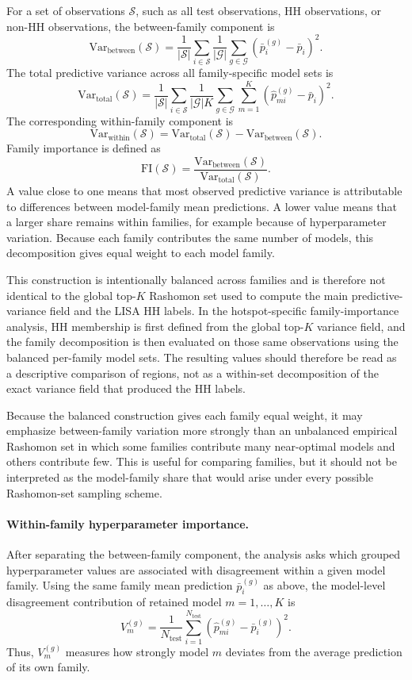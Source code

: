 For a set of observations \(\mathcal{S}\), such as all test observations, HH observations,
or non-HH observations, the between-family component is
\[
\mathrm{Var}_{\mathrm{between}}(\mathcal{S})
=
\frac{1}{|\mathcal{S}|}
\sum_{i\in \mathcal{S}}
\frac{1}{|\mathcal{G}|}
\sum_{g\in \mathcal{G}}
\left(\bar{p}^{(g)}_{i}-\bar{p}_{i}\right)^2 .
\]
The total predictive variance across all family-specific model sets is
\[
\mathrm{Var}_{\mathrm{total}}(\mathcal{S})
=
\frac{1}{|\mathcal{S}|}
\sum_{i\in \mathcal{S}}
\frac{1}{|\mathcal{G}|K}
\sum_{g\in \mathcal{G}}
\sum_{m=1}^{K}
\left(\hat{p}^{(g)}_{mi}-\bar{p}_{i}\right)^2 .
\]
The corresponding within-family component is
\[
\mathrm{Var}_{\mathrm{within}}(\mathcal{S})
=
\mathrm{Var}_{\mathrm{total}}(\mathcal{S})
-
\mathrm{Var}_{\mathrm{between}}(\mathcal{S}).
\]
Family importance is defined as
\[
\mathrm{FI}(\mathcal{S}) =
\frac{\mathrm{Var}_{\mathrm{between}}(\mathcal{S})}
{\mathrm{Var}_{\mathrm{total}}(\mathcal{S})}.
\]
A value close to one means that most observed predictive variance is attributable to
differences between model-family mean predictions. A lower value means that a larger
share remains within families, for example because of hyperparameter variation. Because
each family contributes the same number of models, this decomposition gives equal weight
to each model family.

This construction is intentionally balanced across families and is therefore not identical
to the global top-\(K\) Rashomon set used to compute the main predictive-variance field
and the LISA HH labels. In the hotspot-specific family-importance analysis, HH membership
is first defined from the global top-\(K\) variance field, and the family decomposition is then
evaluated on those same observations using the balanced per-family model sets. The
resulting values should therefore be read as a descriptive comparison of regions, not as a
within-set decomposition of the exact variance field that produced the HH labels.

Because the balanced construction gives each family equal weight, it may emphasize
between-family variation more strongly than an unbalanced empirical Rashomon set in
which some families contribute many near-optimal models and others contribute few.
This is useful for comparing families, but it should not be interpreted as the model-family
share that would arise under every possible Rashomon-set sampling scheme.

\paragraph{Within-family hyperparameter importance.}
After separating the between-family component, the analysis asks which grouped
hyperparameter values are associated with disagreement within a given model family.
Using the same family mean prediction \(\bar{p}^{(g)}_i\) as above, the model-level
disagreement contribution of retained model \(m=1,\ldots,K\) is
\[
V^{(g)}_m =
\frac{1}{N_{\mathrm{test}}}\sum_{i=1}^{N_{\mathrm{test}}}
\left(\hat{p}^{(g)}_{mi}-\bar{p}^{(g)}_i\right)^2.
\]
Thus, \(V^{(g)}_m\) measures how strongly model \(m\) deviates from the average prediction
of its own family.

